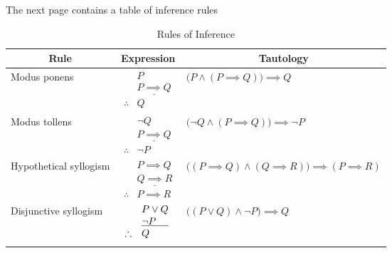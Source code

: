\documentclass{MathNotes}
\begin{document}
The next page contains a table of inference rules
\newpage
\begin{table}[h!]\label{tab:inference-rules}
	\centering
	\caption{Rules of Inference}
	\begin{tabular}{lll}
		\multicolumn{1}{c}{\textbf{Rule}}                          &
		\multicolumn{1}{c}{\textbf{Expression}}                    &
		\multicolumn{1}{c}{\textbf{Tautology}}                            \\
		\midrule
		Modus ponens                                               &
		$\begin{array}{rl}
				            & P                       \\
				            & \underline{P\implies Q} \\
				 \therefore & Q\end{array}$                    &
		$\big(P\land(P\implies Q)\big)\implies Q$                         \\
		\hdashline{}
		Modus tollens                                              &
		$\begin{array}{rl}
				            & \lnot Q                 \\
				            & \underline{P\implies Q} \\
				 \therefore & \lnot P\end{array}$                    &
		$\big(\lnot Q\land(P\implies Q)\big)\implies \lnot P$             \\
		\hdashline{}
		Hypothetical syllogism                                     &
		$\begin{array}{rl}
				            & P\implies Q             \\
				            & \underline{Q\implies R} \\
				 \therefore & P\implies R\end{array}$                    &
		$\big((P\implies Q)\land(Q\implies R)\big)\implies (P\implies R)$ \\
		\hdashline{}
		Disjunctive syllogism                                      &
		$\begin{array}{rl}
				            & P\lor Q                            \\
				            & \underline{\lnot P\hspace{1.25em}} \\
				 \therefore & Q\end{array}$ &
		$\big((P\lor Q)\land\lnot P\big)\implies Q$                       \\
		\hdashline{}

\end{tabular}
\end{table}
\end{document}

